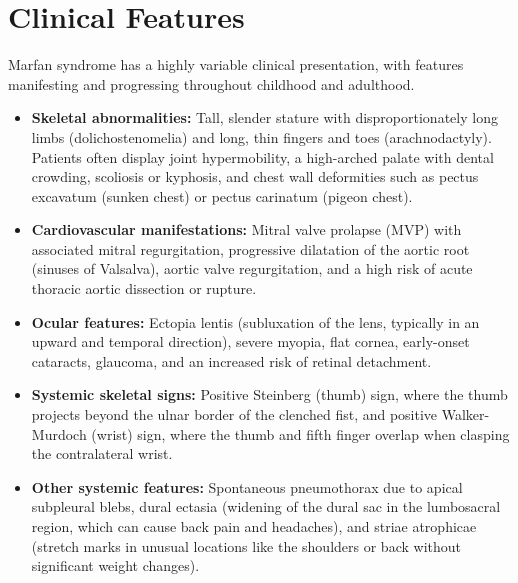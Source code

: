 \section*{Clinical Features}
Marfan syndrome has a highly variable clinical presentation, with features manifesting and progressing throughout childhood and adulthood.
\begin{itemize}
    \item \textbf{Skeletal abnormalities:} Tall, slender stature with disproportionately long limbs (dolichostenomelia) and long, thin fingers and toes (arachnodactyly). Patients often display joint hypermobility, a high-arched palate with dental crowding, scoliosis or kyphosis, and chest wall deformities such as pectus excavatum (sunken chest) or pectus carinatum (pigeon chest).
    \item \textbf{Cardiovascular manifestations:} Mitral valve prolapse (MVP) with associated mitral regurgitation, progressive dilatation of the aortic root (sinuses of Valsalva), aortic valve regurgitation, and a high risk of acute thoracic aortic dissection or rupture.
    \item \textbf{Ocular features:} Ectopia lentis (subluxation of the lens, typically in an upward and temporal direction), severe myopia, flat cornea, early-onset cataracts, glaucoma, and an increased risk of retinal detachment.
    \item \textbf{Systemic skeletal signs:} Positive Steinberg (thumb) sign, where the thumb projects beyond the ulnar border of the clenched fist, and positive Walker-Murdoch (wrist) sign, where the thumb and fifth finger overlap when clasping the contralateral wrist.
    \item \textbf{Other systemic features:} Spontaneous pneumothorax due to apical subpleural blebs, dural ectasia (widening of the dural sac in the lumbosacral region, which can cause back pain and headaches), and striae atrophicae (stretch marks in unusual locations like the shoulders or back without significant weight changes).
\end{itemize}

